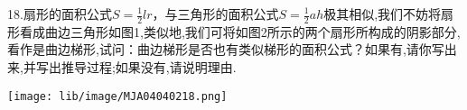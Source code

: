 18.扇形的面积公式$S=\frac{1}{2}lr$，与三角形的面积公式$S=\frac{1}{2}ah$极其相似,我们不妨将扇形看成曲边三角形如图1,类似地,我们可将如图2所示的两个扇形所构成的阴影部分,看作是曲边梯形,试问：曲边梯形是否也有类似梯形的面积公式？如果有,请你写出来,并写出推导过程;如果没有,请说明理由.

\begin{flushright}

    \texttt{[image: lib/image/MJA04040218.png]}

\end{flushright}



